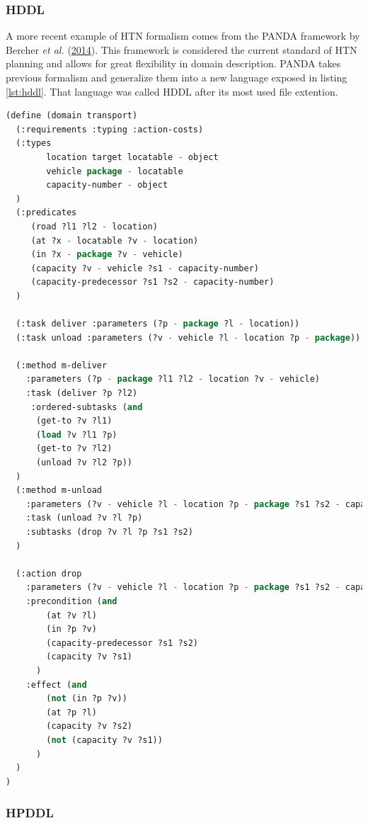 \documentclass[11pt,a4paper,twoside,openright,titlepage,numbers=noenddot,headinclude,cleardoublepage=empty,openany]{scrreprt}
\theoremstyle{plain}
\theoremstyle{definition}
\theoremstyle{remark}
\begin{document}
\hypertarget{hddl}{%
\subsubsection{HDDL}\label{hddl}}

A more recent example of HTN formalism comes from the PANDA framework by
Bercher \emph{et al.}
(\protect\hyperlink{ref-bercher_hybrid_2014}{2014}). This framework is
considered the current standard of HTN planning and allows for great
flexibility in domain description. PANDA takes previous formalism and
generalize them into a new language exposed in listing \ref{lst:hddl}.
That language was called HDDL after its most used file extention.

\begin{lstlisting}[language=Lisp, caption={Example of HDDL syntax as used in the PANDA framework.}, escapechar={$}, label=lst:hddl]
(define (domain transport)
  (:requirements :typing :action-costs)
  (:types
        location target locatable - object
        vehicle package - locatable
        capacity-number - object
  )
  (:predicates 
     (road ?l1 ?l2 - location)
     (at ?x - locatable ?v - location)
     (in ?x - package ?v - vehicle)
     (capacity ?v - vehicle ?s1 - capacity-number)
     (capacity-predecessor ?s1 ?s2 - capacity-number)
  )

  (:task deliver :parameters (?p - package ?l - location))
  (:task unload :parameters (?v - vehicle ?l - location ?p - package))

  (:method m-deliver
    :parameters (?p - package ?l1 ?l2 - location ?v - vehicle)
    :task (deliver ?p ?l2)
     :ordered-subtasks (and
      (get-to ?v ?l1)
      (load ?v ?l1 ?p)
      (get-to ?v ?l2)
      (unload ?v ?l2 ?p))
  )
  (:method m-unload
    :parameters (?v - vehicle ?l - location ?p - package ?s1 ?s2 - capacity-number)
    :task (unload ?v ?l ?p)
    :subtasks (drop ?v ?l ?p ?s1 ?s2)
  )

  (:action drop
    :parameters (?v - vehicle ?l - location ?p - package ?s1 ?s2 - capacity-number)
    :precondition (and
        (at ?v ?l)
        (in ?p ?v)
        (capacity-predecessor ?s1 ?s2)
        (capacity ?v ?s1)
      )
    :effect (and
        (not (in ?p ?v))
        (at ?p ?l)
        (capacity ?v ?s2)
        (not (capacity ?v ?s1))
      )
  )
)
\end{lstlisting}

\hypertarget{hpddl}{%
\subsubsection{HPDDL}\label{hpddl}}
\end{document}
